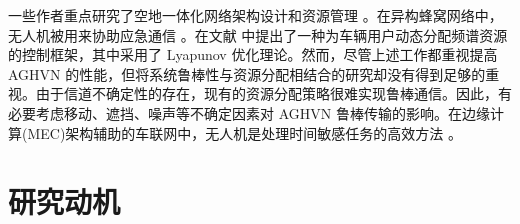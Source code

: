 一些作者重点研究了空地一体化网络架构设计和资源管理 \supercite{OUC,OSI}。在异构蜂窝网络中，无人机被用来协助应急通信 \supercite{DSF}。在文献 \cite{SDR}中提出了一种为车辆用户动态分配频谱资源的控制框架，其中采用了 Lyapunov 优化理论。然而，尽管上述工作都重视提高 AGHVN 的性能，但将系统鲁棒性与资源分配相结合的研究却没有得到足够的重视。由于信道不确定性的存在，现有的资源分配策略很难实现鲁棒通信。因此，有必要考虑移动、遮挡、噪声等不确定因素对 AGHVN 鲁棒传输的影响。在边缘计算(MEC)架构辅助的车联网中，无人机是处理时间敏感任务的高效方法 \supercite{无人机辅助230770}。

\section{研究动机}\label{section1-3}

